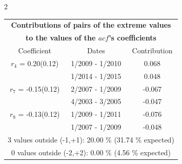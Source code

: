 
\thispagestyle{empty}
\begin{multicols}{2}{ 
\begin{tabular}{ccc}
\multicolumn{3}{c}{\textbf{Contributions of pairs of the extreme values} }  \vspace{-.10in}  \\ 
\multicolumn{3}{c}{ \textbf{to the values of the $acf$'s coefficients}} \\ 
\hline 
\hline                  Coefficient  &  Dates &  Contribution \\ 
\hline 
  $r_{ 4}$ = 0.20(0.12) &       1/2009 -  1/2010 &        0.068   \vspace{-.10in} \\  
&        1/2014 -  1/2015 &        0.048  \vspace{-.02in} \\ \hline 
  $r_{ 7}$ = -0.15(0.12) &       2/2007 -  1/2009 &       -0.067    \vspace{-.10in} \\ 
  &        4/2003 -  3/2005 &       -0.047  \vspace{-.02in}   \\ \hline 
    $r_{ 8}$ = -0.13(0.12) &       1/2009 -  1/2011 &       -0.076    \vspace{-.10in} \\ 
  &        1/2007 -  1/2009 &       -0.048  \vspace{-.02in}   \\ \hline 
  \multicolumn{3}{c}{               3 values outside (-1,+1): 20.00  \% (31.74  \% expected)}\vspace{-.10in} \\ 
\multicolumn{3}{c}{               0 values outside (-2,+2):  0.00 \%  (4.56 \% expected) } \\
 \end{tabular} \\ 
 } 
\end{multicols} 
